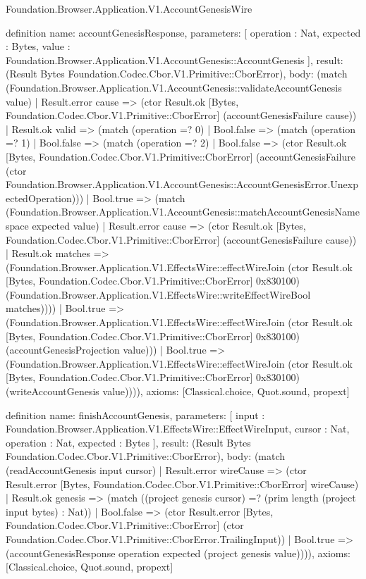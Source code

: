 \begin{lexlean}{Foundation.Browser.Application.V1.AccountGenesisWire}
\begin{semanticmodule}
definition{
  name: accountGenesisResponse,
  parameters: [
    operation : Nat,
    expected : Bytes,
    value : Foundation.Browser.Application.V1.AccountGenesis::AccountGenesis
  ],
  result: (Result Bytes Foundation.Codec.Cbor.V1.Primitive::CborError),
  body: (match (Foundation.Browser.Application.V1.AccountGenesis::validateAccountGenesis value)
    | Result.error cause => (ctor Result.ok [Bytes, Foundation.Codec.Cbor.V1.Primitive::CborError] (accountGenesisFailure cause))
    | Result.ok valid => (match (operation =? 0)
      | Bool.false => (match (operation =? 1)
        | Bool.false => (match (operation =? 2)
          | Bool.false => (ctor Result.ok [Bytes, Foundation.Codec.Cbor.V1.Primitive::CborError] (accountGenesisFailure (ctor Foundation.Browser.Application.V1.AccountGenesis::AccountGenesisError.UnexpectedOperation)))
          | Bool.true => (match (Foundation.Browser.Application.V1.AccountGenesis::matchAccountGenesisNamespace expected value)
            | Result.error cause => (ctor Result.ok [Bytes, Foundation.Codec.Cbor.V1.Primitive::CborError] (accountGenesisFailure cause))
            | Result.ok matches => (Foundation.Browser.Application.V1.EffectsWire::effectWireJoin (ctor Result.ok [Bytes, Foundation.Codec.Cbor.V1.Primitive::CborError] 0x830100) (Foundation.Browser.Application.V1.EffectsWire::writeEffectWireBool matches))))
        | Bool.true => (Foundation.Browser.Application.V1.EffectsWire::effectWireJoin (ctor Result.ok [Bytes, Foundation.Codec.Cbor.V1.Primitive::CborError] 0x830100) (accountGenesisProjection value)))
      | Bool.true => (Foundation.Browser.Application.V1.EffectsWire::effectWireJoin (ctor Result.ok [Bytes, Foundation.Codec.Cbor.V1.Primitive::CborError] 0x830100) (writeAccountGenesis value)))),
  axioms: [Classical.choice, Quot.sound, propext]
}

definition{
  name: finishAccountGenesis,
  parameters: [
    input : Foundation.Browser.Application.V1.EffectsWire::EffectWireInput,
    cursor : Nat,
    operation : Nat,
    expected : Bytes
  ],
  result: (Result Bytes Foundation.Codec.Cbor.V1.Primitive::CborError),
  body: (match (readAccountGenesis input cursor)
    | Result.error wireCause => (ctor Result.error [Bytes, Foundation.Codec.Cbor.V1.Primitive::CborError] wireCause)
    | Result.ok genesis => (match ((project genesis cursor) =? (prim length (project input bytes) : Nat))
      | Bool.false => (ctor Result.error [Bytes, Foundation.Codec.Cbor.V1.Primitive::CborError] (ctor Foundation.Codec.Cbor.V1.Primitive::CborError.TrailingInput))
      | Bool.true => (accountGenesisResponse operation expected (project genesis value)))),
  axioms: [Classical.choice, Quot.sound, propext]
}


\end{semanticmodule}
\end{lexlean}
